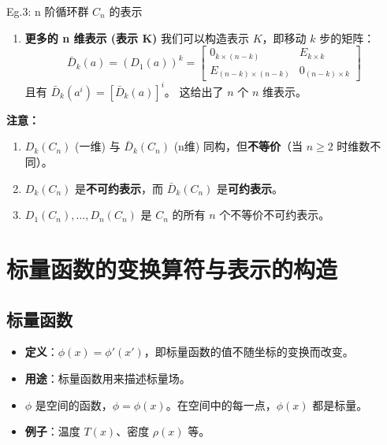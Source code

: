 \begin{example}{Eg.3: n 阶循环群 $C_n$ 的表示}
\begin{enumerate}
        \item \textbf{更多的 n 维表示 (表示 K)}
    我们可以构造表示 $K$，即移动 $k$ 步的矩阵：
    \begin{equation}
        \bar{D}_k(a) = (D_1(a))^k = \begin{bmatrix} 
            0_{k \times (n-k)} & E_{k \times k} \\ 
            E_{(n-k) \times (n-k)} & 0_{(n-k) \times k} 
        \end{bmatrix}
    \end{equation}
    且有 $\bar{D}_k(a^i) = [\bar{D}_k(a)]^i$。
    这给出了 $n$ 个 $n$ 维表示。

    \end{enumerate}
    \textbf{注意：}
    \begin{enumerate}
        \item $D_k(C_n)$ (一维) 与 $\bar{D}_k(C_n)$ (n维) 同构，但\textbf{不等价}（当 $n \ge 2$ 时维数不同）。
        \item $D_k(C_n)$ 是\textbf{不可约表示}，而 $\bar{D}_k(C_n)$ 是\textbf{可约表示}。
        \item $D_1(C_n), \dots, D_n(C_n)$ 是 $C_n$ 的所有 $n$ 个不等价不可约表示。
    \end{enumerate}
\end{example}

















\section{标量函数的变换算符与表示的构造}

\subsection{标量函数}
\begin{itemize}
    \item \textbf{定义}：$\phi(x) = \phi'(x')$，即标量函数的值不随坐标的变换而改变。
    \item \textbf{用途}：标量函数用来描述标量场。
    \item $\phi$ 是空间的函数，$\phi = \phi(x)$。在空间中的每一点，$\phi(x)$ 都是标量。
    \item \textbf{例子}：温度 $T(x)$、密度 $\rho(x)$ 等。
\end{itemize}

